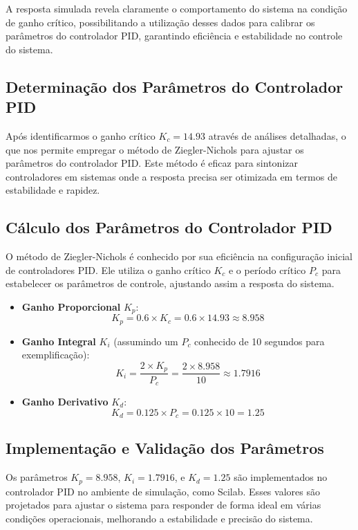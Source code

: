 A resposta simulada revela claramente o comportamento do sistema na condição de ganho crítico, possibilitando a utilização desses dados para calibrar os parâmetros do controlador PID, garantindo eficiência e estabilidade no controle do sistema.


\subsection{Determinação dos Parâmetros do Controlador PID}
Após identificarmos o ganho crítico \( K_c = 14.93 \) através de análises detalhadas, o que nos permite empregar o método de Ziegler-Nichols para ajustar os parâmetros do controlador PID. Este método é eficaz para sintonizar controladores em sistemas onde a resposta precisa ser otimizada em termos de estabilidade e rapidez.

\subsection{Cálculo dos Parâmetros do Controlador PID}
O método de Ziegler-Nichols é conhecido por sua eficiência na configuração inicial de controladores PID. Ele utiliza o ganho crítico \( K_c \) e o período crítico \( P_c \) para estabelecer os parâmetros de controle, ajustando assim a resposta do sistema.

\begin{itemize}
    \item \textbf{Ganho Proporcional} \( K_p \):
          \[
              K_p = 0.6 \times K_c = 0.6 \times 14.93 \approx 8.958
          \]
    \item \textbf{Ganho Integral} \( K_i \) (assumindo um \( P_c \) conhecido de 10 segundos para exemplificação):
          \[
              K_i = \frac{2 \times K_p}{P_c} = \frac{2 \times 8.958}{10} \approx 1.7916
          \]
    \item \textbf{Ganho Derivativo} \( K_d \):
          \[
              K_d = 0.125 \times P_c = 0.125 \times 10 = 1.25
          \]
\end{itemize}

\subsection{Implementação e Validação dos Parâmetros}
Os parâmetros \( K_p = 8.958 \), \( K_i = 1.7916 \), e \( K_d = 1.25 \) são implementados no controlador PID no ambiente de simulação, como Scilab. Esses valores são projetados para ajustar o sistema para responder de forma ideal em várias condições operacionais, melhorando a estabilidade e precisão do sistema.

